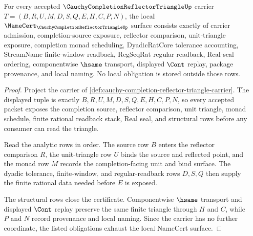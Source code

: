 \begin{theorem}
\label{thm:cauchy-completion-reflector-triangle-namecert-obligations}
For every accepted $\CauchyCompletionReflectorTriangleUp$ carrier $T=(B,R,U,M,D,S,Q,E,H,C,P,N)$, the local $\NameCert_{\CauchyCompletionReflectorTriangleUp}$ surface consists exactly of carrier admission, completion-source exposure, reflector comparison, unit-triangle exposure, completion monad scheduling, DyadicRatCore tolerance accounting, StreamName finite-window readback, RegSeqRat regular readback, Real-seal ordering, componentwise $\hsame$ transport, displayed $\Cont$ replay, package provenance, and local naming. No local obligation is stored outside those rows.
\end{theorem}
\begin{proof}
Project the carrier of \autoref{def:cauchy-completion-reflector-triangle-carrier}. The displayed tuple is exactly $B,R,U,M,D,S,Q,E,H,C,P,N$, so every accepted packet exposes the completion source, reflector comparison, unit triangle, monad schedule, finite rational readback stack, Real seal, and structural rows before any consumer can read the triangle.

Read the analytic rows in order. The source row $B$ enters the reflector comparison $R$, the unit-triangle row $U$ binds the source and reflected point, and the monad row $M$ records the completion-facing unit and bind surface. The dyadic tolerance, finite-window, and regular-readback rows $D,S,Q$ then supply the finite rational data needed before $E$ is exposed.

The structural rows close the certificate. Componentwise $\hsame$ transport and displayed $\Cont$ replay preserve the same finite triangle through $H$ and $C$, while $P$ and $N$ record provenance and local naming. Since the carrier has no further coordinate, the listed obligations exhaust the local NameCert surface.
\end{proof}

